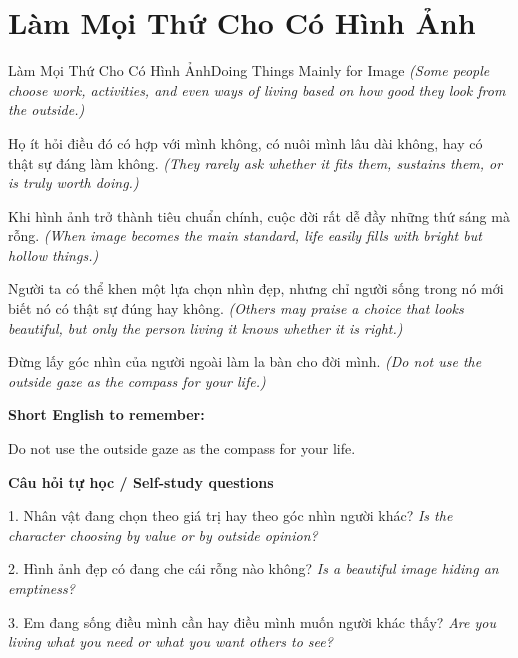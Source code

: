 \section{Làm Mọi Thứ Cho Có Hình Ảnh}
\begin{truyen}{Làm Mọi Thứ Cho Có Hình Ảnh}{Doing Things Mainly for Image}
\textit{(Some people choose work, activities, and even ways of living based on how good they look from the outside.)}

Họ ít hỏi điều đó có hợp với mình không, có nuôi mình lâu dài không, hay có thật sự đáng làm không.
\textit{(They rarely ask whether it fits them, sustains them, or is truly worth doing.)}

Khi hình ảnh trở thành tiêu chuẩn chính, cuộc đời rất dễ đầy những thứ sáng mà rỗng.
\textit{(When image becomes the main standard, life easily fills with bright but hollow things.)}

Người ta có thể khen một lựa chọn nhìn đẹp, nhưng chỉ người sống trong nó mới biết nó có thật sự đúng hay không.
\textit{(Others may praise a choice that looks beautiful, but only the person living it knows whether it is right.)}

\end{truyen}

\begin{baihoc}
Đừng lấy góc nhìn của người ngoài làm la bàn cho đời mình.
\textit{(Do not use the outside gaze as the compass for your life.)}
\end{baihoc}

\begin{ghinhoanh}
\textbf{Short English to remember:}

Do not use the outside gaze as the compass for your life.

\end{ghinhoanh}

\begin{tuhocnhanh}
\textbf{Câu hỏi tự học / Self-study questions}

1. Nhân vật đang chọn theo giá trị hay theo góc nhìn người khác? \textit{Is the character choosing by value or by outside opinion?}

2. Hình ảnh đẹp có đang che cái rỗng nào không? \textit{Is a beautiful image hiding an emptiness?}

3. Em đang sống điều mình cần hay điều mình muốn người khác thấy? \textit{Are you living what you need or what you want others to see?}
\end{tuhocnhanh}
\ngancach

